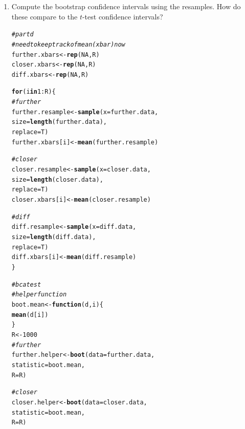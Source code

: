 \documentclass{article}\usepackage[]{graphicx}\usepackage[]{xcolor}
\makeatletter
\newcommand{\hlnum}[1]{\textcolor[rgb]{0.686,0.059,0.569}{#1}}%
\newcommand{\hlcom}[1]{\textcolor[rgb]{0.678,0.584,0.686}{\textit{#1}}}%
\newcommand{\hlopt}[1]{\textcolor[rgb]{0,0,0}{#1}}%
\newcommand{\hldef}[1]{\textcolor[rgb]{0.345,0.345,0.345}{#1}}%
\newcommand{\hlkwa}[1]{\textcolor[rgb]{0.161,0.373,0.58}{\textbf{#1}}}%
\newcommand{\hlkwb}[1]{\textcolor[rgb]{0.69,0.353,0.396}{#1}}%
\newcommand{\hlkwc}[1]{\textcolor[rgb]{0.333,0.667,0.333}{#1}}%
\newcommand{\hlkwd}[1]{\textcolor[rgb]{0.737,0.353,0.396}{\textbf{#1}}}%
\newenvironment{kframe}{%
 \def\at@end@of@kframe{}%
 \ifinner\ifhmode%
  \def\at@end@of@kframe{\end{minipage}}%
  \begin{minipage}{\columnwidth}%
 \fi\fi%
 \def\FrameCommand##1{\hskip\@totalleftmargin \hskip-\fboxsep
 \colorbox{shadecolor}{##1}\hskip-\fboxsep
     \hskip-\linewidth \hskip-\@totalleftmargin \hskip\columnwidth}%
 \MakeFramed {\advance\hsize-\width
   \@totalleftmargin\z@ \linewidth\hsize
   \@setminipage}}%
 {\par\unskip\endMakeFramed%
 \at@end@of@kframe}
\newenvironment{knitrout}{}{} %
\makeatother
\begin{document}
\begin{enumerate}
\begin{enumerate}
  \item Compute the bootstrap confidence intervals using the resamples. How do these 
  compare to the $t$-test confidence intervals? \\
\begin{knitrout}
\color{fgcolor}\begin{kframe}
\begin{alltt}
\hlcom{# part d}
\hlcom{# need to keep track of mean (xbar) now}
\hldef{further.xbars} \hlkwb{<-} \hlkwd{rep}\hldef{(}\hlnum{NA}\hldef{, R)}
\hldef{closer.xbars} \hlkwb{<-} \hlkwd{rep}\hldef{(}\hlnum{NA}\hldef{, R)}
\hldef{diff.xbars} \hlkwb{<-} \hlkwd{rep}\hldef{(}\hlnum{NA}\hldef{, R)}

\hlkwa{for} \hldef{(i} \hlkwa{in} \hlnum{1}\hlopt{:}\hldef{R)\{}
\hlcom{# further}
\hldef{further.resample} \hlkwb{<-} \hlkwd{sample}\hldef{(}\hlkwc{x} \hldef{= further.data,}
                           \hlkwc{size}\hldef{=} \hlkwd{length}\hldef{(further.data),}
                           \hlkwc{replace} \hldef{= T)}
\hldef{further.xbars[i]} \hlkwb{<-} \hlkwd{mean}\hldef{(further.resample)}

\hlcom{# closer}
\hldef{closer.resample} \hlkwb{<-} \hlkwd{sample}\hldef{(}\hlkwc{x} \hldef{= closer.data,}
                          \hlkwc{size}\hldef{=} \hlkwd{length}\hldef{(closer.data),}
                          \hlkwc{replace} \hldef{= T)}
\hldef{closer.xbars[i]} \hlkwb{<-} \hlkwd{mean}\hldef{(closer.resample)}

\hlcom{# diff}
\hldef{diff.resample} \hlkwb{<-} \hlkwd{sample}\hldef{(}\hlkwc{x} \hldef{= diff.data,}
                        \hlkwc{size}\hldef{=} \hlkwd{length}\hldef{(diff.data),}
                        \hlkwc{replace} \hldef{= T)}
\hldef{diff.xbars[i]} \hlkwb{<-} \hlkwd{mean}\hldef{(diff.resample)}
\hldef{\}}

\hlcom{# bca test}
\hlcom{# helper function}
\hldef{boot.mean} \hlkwb{<-} \hlkwa{function}\hldef{(}\hlkwc{d}\hldef{,} \hlkwc{i}\hldef{)\{}
\hlkwd{mean}\hldef{(d[i])}
\hldef{\}}
\hldef{R} \hlkwb{<-} \hlnum{1000}
\hlcom{# further}
\hldef{further.helper} \hlkwb{<-} \hlkwd{boot}\hldef{(}\hlkwc{data} \hldef{= further.data,}
                     \hlkwc{statistic} \hldef{= boot.mean,}
                     \hlkwc{R} \hldef{= R)}
\end{alltt}


{\ttfamily\noindent\bfseries{}}\begin{alltt}
\hlcom{# closer}
\hldef{closer.helper} \hlkwb{<-} \hlkwd{boot}\hldef{(}\hlkwc{data} \hldef{= closer.data,}
                    \hlkwc{statistic} \hldef{= boot.mean,}
                    \hlkwc{R} \hldef{= R)}
\end{alltt}



\end{kframe}
\end{knitrout}
\end{enumerate}
\end{enumerate}
\end{document}
